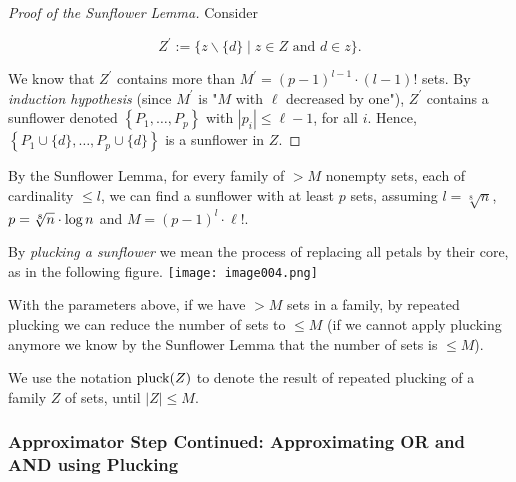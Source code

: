 \begin{proof}[Proof of the Sunflower Lemma]
Consider

$$
Z^{\prime}:=\{z \backslash\{d\} \mid z \in Z \text { and } d \in z\} .
$$


We know that $Z^{\prime}$ contains more than $M^{\prime}=(p-1)^{l-1} \cdot(l-1)!$ sets.
By \emph{induction hypothesis} (since $M^{\prime}$ is "$M$ with $\ell$ decreased by one"), $Z^{\prime}$ contains a sunflower denoted $\left\{P_1, \ldots, P_p\right\}$ with $\left|p_i\right| \leq \ell-1$, for all $i$.
Hence, $\left\{P_1 \cup\{d\}, \ldots, P_p \cup\{d\}\right\}$ is a sunflower in $Z$.
\end{proof}


 By the Sunflower Lemma, for every family of $>M$ nonempty sets, each of cardinality $\leq l$, we can find a sunflower with at least $p$ sets, assuming    
$l=\sqrt[8]{n}$, $p =\sqrt[8]{n}\cdot\log n$ and $M=(p-1)^l \cdot \ell!$.

By \emph{plucking a sunflower} we mean the process of replacing all petals by their core, as in the following figure. 
\texttt{[image: image004.png]}


\begin{corollary}
With the parameters above, if we have $>M$ sets in a family, by repeated plucking we can reduce the number of sets to $\leq M$ (if we cannot apply plucking anymore we know by the Sunflower Lemma that the number of sets is $\leq M$).
\end{corollary}
We use the notation 
${\rm pluck}(Z)$ to denote the result of repeated plucking of a family $Z$ of sets, until $|Z| \leq M$.



\subsubsection{  Approximator Step Continued: Approximating OR and AND using Plucking}

